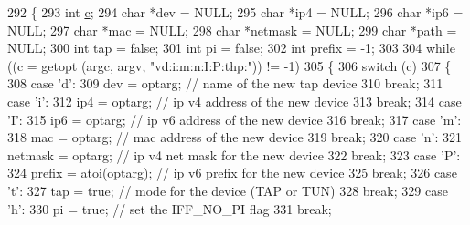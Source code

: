 \begin{DoxyCode}
292 \{
293   \textcolor{keywordtype}{int} \hyperlink{lte_2model_2fading-traces_2fading__trace__generator_8m_ae0323a9039add2978bf5b49550572c7c}{c};
294   \textcolor{keywordtype}{char} *dev = NULL;
295   \textcolor{keywordtype}{char} *ip4 = NULL;
296   \textcolor{keywordtype}{char} *ip6 = NULL;
297   \textcolor{keywordtype}{char} *mac = NULL;
298   \textcolor{keywordtype}{char} *netmask = NULL;
299   \textcolor{keywordtype}{char} *path = NULL;
300   \textcolor{keywordtype}{int} tap = \textcolor{keyword}{false};
301   \textcolor{keywordtype}{int} pi = \textcolor{keyword}{false};
302   \textcolor{keywordtype}{int} prefix = -1;
303 
304   \textcolor{keywordflow}{while} ((c = getopt (argc, argv, \textcolor{stringliteral}{"vd:i:m:n:I:P:thp:"})) != -1)
305     \{
306       \textcolor{keywordflow}{switch} (c)
307         \{
308         \textcolor{keywordflow}{case} \textcolor{charliteral}{'d'}:
309           dev = optarg;           \textcolor{comment}{// name of the new tap device}
310           \textcolor{keywordflow}{break};
311         \textcolor{keywordflow}{case} \textcolor{charliteral}{'i'}:
312           ip4 = optarg;            \textcolor{comment}{// ip v4 address of the new device}
313           \textcolor{keywordflow}{break};
314         \textcolor{keywordflow}{case} \textcolor{charliteral}{'I'}:
315           ip6 = optarg;            \textcolor{comment}{// ip v6 address of the new device}
316           \textcolor{keywordflow}{break};
317         \textcolor{keywordflow}{case} \textcolor{charliteral}{'m'}:
318           mac = optarg;           \textcolor{comment}{// mac address of the new device}
319           \textcolor{keywordflow}{break};
320         \textcolor{keywordflow}{case} \textcolor{charliteral}{'n'}:
321           netmask = optarg;       \textcolor{comment}{// ip v4 net mask for the new device}
322           \textcolor{keywordflow}{break};
323         \textcolor{keywordflow}{case} \textcolor{charliteral}{'P'}:
324           prefix = atoi(optarg);         \textcolor{comment}{// ip v6 prefix for the new device}
325           \textcolor{keywordflow}{break};
326         \textcolor{keywordflow}{case} \textcolor{charliteral}{'t'}:
327           tap = \textcolor{keyword}{true};             \textcolor{comment}{// mode for the device (TAP or TUN)}
328           \textcolor{keywordflow}{break};
329         \textcolor{keywordflow}{case} \textcolor{charliteral}{'h'}:
330           pi = \textcolor{keyword}{true};              \textcolor{comment}{// set the IFF\_NO\_PI flag}
331           \textcolor{keywordflow}{break};

\end{DoxyCode}
